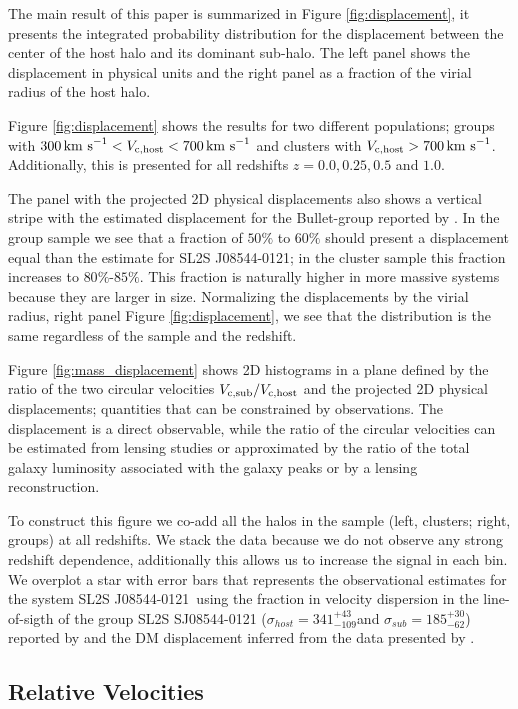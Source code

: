 \documentclass{emulateapj}
\newcommand{\kms}{{\ifmmode{{\mathrm{\,km\ s}^{-1}}}\else{\,km~s$^{-1}$}\fi}}
\newcommand{\bullg}{SL2S J08544-0121}
\begin{document}
The main result of this paper is summarized in Figure
\ref{fig:displacement}, it presents the integrated
probability distribution for the displacement between the center of
the host halo and its dominant sub-halo. The left panel shows
the displacement in physical units and the right panel as a fraction
of the virial radius of the host halo. 

Figure \ref{fig:displacement} shows the results for two different
populations; groups with $300\kms < V_{\rm c, host}<700\kms$ and
clusters with $V_{\rm c,host}>700\kms$. Additionally, this is
presented for all redshifts $z=0.0, 0.25, 0.5$ and $1.0$. 

The panel with the projected 2D physical displacements also shows a
vertical stripe with the estimated displacement for the Bullet-group reported by
\cite{Gastaldello}. In the group sample we see that a fraction of
$50\%$ to $60\%$  should present a displacement equal than the
estimate for \bullg; in the cluster sample this fraction increases to
$80\%$-$85\%$. This fraction is naturally higher in more massive
systems because they are larger in size. Normalizing the displacements
by the virial radius, right panel Figure \ref{fig:displacement}, we
see that the distribution is the same regardless of the sample and the
redshift.

Figure \ref{fig:mass_displacement} shows 2D histograms in a plane
defined by the ratio of the two circular velocities $V_{\rm c,
  sub}/V_{\rm c, host}$ and the projected 2D physical displacements;
quantities that can be constrained by observations. The displacement
is a direct observable, while the ratio of the circular velocities can
be estimated from lensing studies or approximated by the ratio of the
total galaxy luminosity associated with the galaxy peaks or by a
lensing reconstruction. 

To construct this figure we co-add all the halos in the sample (left,
clusters; right, groups) at all redshifts. We stack the data because
we do not observe any strong redshift dependence, additionally this allows
us to increase the signal in each bin. We overplot a star with error
bars that represents the observational estimates for the system
\bullg\ using the fraction in velocity dispersion in the line-of-sigth
of the group SL2S SJ08544-0121 ($\sigma_{host}=341^{+43}_{-109}$\kms and
$\sigma_{sub}=185^{+30}_{-62}$\kms) reported by
\citet{2013A&A...552A..80M} and the DM displacement inferred from the
data presented by \cite{Gastaldello}.  


\subsection{Relative Velocities}
\label{sec:velocities}
\end{document}
